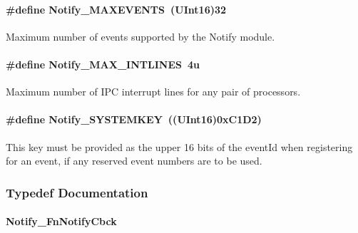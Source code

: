 \paragraph[{Notify\-\_\-\-M\-A\-X\-E\-V\-E\-N\-T\-S}]{\setlength{\rightskip}{0pt plus 5cm}\#define Notify\-\_\-\-M\-A\-X\-E\-V\-E\-N\-T\-S~(U\-Int16)32}\label{_notify_8h_afb698e2a48abcb1b698e80a16b38bf43}


Maximum number of events supported by the Notify module. 

\paragraph[{Notify\-\_\-\-M\-A\-X\-\_\-\-I\-N\-T\-L\-I\-N\-E\-S}]{\setlength{\rightskip}{0pt plus 5cm}\#define Notify\-\_\-\-M\-A\-X\-\_\-\-I\-N\-T\-L\-I\-N\-E\-S~4u}\label{_notify_8h_a67e0ce1661274a428248b143dd41dbfc}


Maximum number of I\-P\-C interrupt lines for any pair of processors. 

\paragraph[{Notify\-\_\-\-S\-Y\-S\-T\-E\-M\-K\-E\-Y}]{\setlength{\rightskip}{0pt plus 5cm}\#define Notify\-\_\-\-S\-Y\-S\-T\-E\-M\-K\-E\-Y~((U\-Int16)0x\-C1\-D2)}\label{_notify_8h_ac33600d8704857ef0afbbee3d4ce6d80}


This key must be provided as the upper 16 bits of the event\-Id when registering for an event, if any reserved event numbers are to be used. 



\subsubsection{Typedef Documentation}
\paragraph[{Notify\-\_\-\-Fn\-Notify\-Cbck}]{\setlength{\rightskip}{0pt plus 5cm}Notify\-\_\-\-Fn\-Notify\-Cbck}\label{_notify_8h_ab362f7571ee3d7f7abaa743914edcd62}


